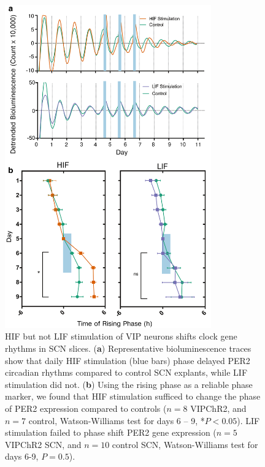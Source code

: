 \begin{figure}[p]
    \begin{center}
        \includegraphics[width=3.5in]{chap5/figures/SupplementaryFigure6.png}
    \end{center}
    \caption{\label{fig:cms6} HIF but not LIF stimulation of VIP neurons shifts clock gene rhythms in SCN slices. 
    (\textbf{a}) Representative bioluminescence traces show that daily HIF stimulation (blue bars) phase delayed PER2 circadian rhythms compared to control SCN explants, while LIF stimulation did not. 
    (\textbf{b}) Using the rising phase as a reliable phase marker, we found that HIF stimulation sufficed to change the phase of PER2 expression compared to controls ($n = 8$ VIPChR2, and $n=7$ control, Watson-Williams test for days 6 – 9, *$P< 0.05$). LIF stimulation failed to phase shift PER2 gene expression ($n = 5$ VIPChR2 SCN, and $n = 10$ control SCN, Watson-Williams test for days 6-9, $P = 0.5$).
    }
\end{figure}

